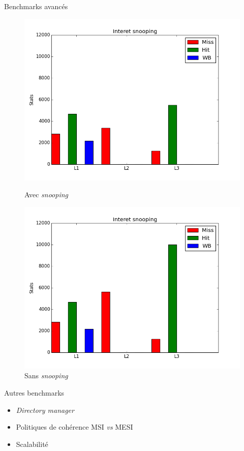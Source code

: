 \begin{frame}{Benchmarks avanc\'es}
\begin{figure}[H]
   \begin{minipage}[l]{.46\textwidth}
     \includegraphics[scale=0.22]{images/stats_falsesharing_snooping.png}
     \caption{Avec \emph{snooping}}
   \end{minipage} \hfill
   \begin{minipage}[r]{.46\textwidth}
     \includegraphics[scale=0.22]{images/stats_falsesharing_no_snooping.png}
     \caption{Sans \emph{snooping}}
   \end{minipage}
\end{figure}
  \begin{block}{Autres benchmarks}
    \begin{itemize}
      \item \emph{Directory manager}
      \item Politiques de coh\'erence MSI \emph{vs} MESI
      \item Scalabilit\'e
    \end{itemize}
  \end{block}
\end{frame}

